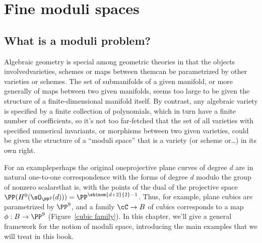 

\chapter{Fine moduli spaces}
\label{Moduli chapter}
\label{ModuliChapter}

\section{What is a moduli problem?}

Algebraic geometry is special among geometric theories in
that
the objects involved\emdash varieties,  schemes or maps between
them\emdash can be parametrized by other varieties or schemes. The set
of submanifolds of a given manifold, or more generally of maps between
two given manifolds, seems too large to be given the structure of a
finite-dimensional manifold itself. By contrast, any algebraic variety
is specified by a finite collection of polynomials, which in turn have
a finite number of coefficients, so it's not too far-fetched that the
set of all varieties with specified numerical invariants, or
morphisms between two given varieties, could be given the structure of
a ``moduli space'' that is a variety (or scheme or\dots) in its own
right.

For an example\emdash perhaps the original one\emdash projective plane
curves of degree $d$
are in natural one-to-one correspondence with the forms of degree $d$
modulo the group of nonzero scalars\emdash that is, with the points of
the dual of the projective space
$ \PP(H^0(\sO_{\PP^2}(d)))=\PP^{\sbinom{d+2}{2}-1} $.
Thus, for example, plane cubics are parametrized by $\PP^{9}$, and a
family $\cC \to B$ of cubics corresponds to a map $\phi: B \to \PP^9$ 
(Figure~\ref{cubic family}).
In this chapter, we'll give a general framework for the notion of moduli
space, introducing the main examples that we will treat in this book.

